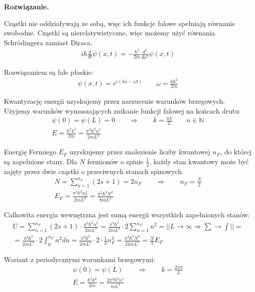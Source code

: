 \documentclass[11pt,a4paper]{article}
\newenvironment{solution}{\vspace{1cm} \par\textbf{Rozwiązanie.} \vspace{1cm}}{}
\begin{document}
\begin{solution}

Cząstki nie oddziaływają ze sobą, więc ich funkcje falowe spełniają 
równanie swobodne. Cząstki są nierelatywistyczne, więc 
możemy użyć równania Schrödingera zamiast Diraca.
\begin{align*}
i\hbar \frac{d}{dt} \psi(x,t) = -\frac{\hbar^2}{2m} \frac{d^2}{dx^2} \psi(x,t)
\end{align*}  

Rozwiązaniem są fale płaskie:
\begin{align*}
\psi(x,t) = e^{i(kx - \omega t)} \qquad \omega = \frac{\hbar k^2}{2m}
\end{align*}

Kwantyzację energii uzyskujemy przez narzucenie warunków brzegowych.
Użyjemy warunków wymuszających znikanie funkcji falowej na końcach drutu:
\begin{align*}
\psi(0) = \psi(L) = 0 \qquad \Rightarrow \qquad k = \frac{n\pi}{L} \qquad n \in \mathbb{N} \\
E = \frac{\hbar^2 k^2}{2m} = \frac{\pi^2 \hbar^2 n^2}{2mL^2}
\end{align*}


Energię Fermiego $E_F$ uzyskujemy przez znalezienie
liczby kwantowej $n_F$, do której są zapełnione stany. 
Dla $N$ fermionów o spinie $\frac{1}{2}$, każdy stan kwantowy może 
być zajęty przez dwie cząstki o przeciwnych stanach spinowych.
\begin{align*}
N = \sum_{n=1}^{n_F} (2s+1) = 2 n_F \qquad \Rightarrow 
\qquad n_F = \frac{N}{2} \\
E_F = \frac{\pi^2 \hbar^2 n_F^2}{2mL^2} = 
\frac{\pi^2 \hbar^2 N^2}{8 m L^2}
\end{align*}

Całkowita energia wewnętrzna jest sumą energii wszystkich 
zapełnionych stanów:
\begin{align*}
U = \sum_{n=1}^{n_F} (2s+1) \cdot \frac{\pi^2 \hbar^2 n^2}{2mL^2} = 
\frac{\pi^2 \hbar^2}{2mL^2} \cdot 2 \sum_{n=1}^{n_F} n^2 = 
|| L \rightarrow \infty  \Rightarrow \sum \rightarrow \int || = \\
= \frac{\pi^2 \hbar^2}{2mL^2} \cdot 2 \int_{0}^{n_F} n^2 dn =
\frac{\pi^2 \hbar^2}{2mL^2} \cdot 2 \cdot \frac{1}{3} n_F^3 =
\frac{\pi^2 \hbar^2 N^3}{24 m L^2} = \frac{N}{3} E_F
\end{align*}

Wariant z periodycznymi warunkami brzegowymi:
\begin{align*}
\psi(0) = \psi(L) \qquad \Rightarrow \qquad k = \frac{2n\pi}{L}  \\
E = \frac{\hbar^2 k^2}{2m} = \frac{2\pi^2 \hbar^2 n^2}{mL^2} 
\end{align*}


\end{solution}
\end{document}
